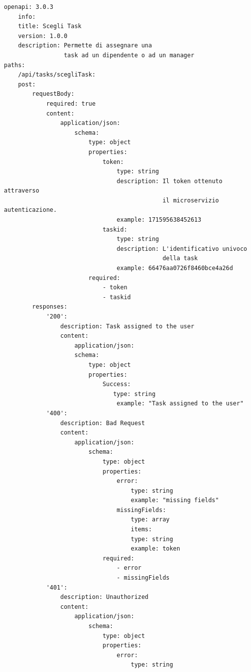 \documentclass{report}
\begin{document}
\begin{verbatim}
openapi: 3.0.3
    info:
    title: Scegli Task
    version: 1.0.0
    description: Permette di assegnare una
                 task ad un dipendente o ad un manager
paths:
    /api/tasks/scegliTask:
    post:
        requestBody:
            required: true
            content:
                application/json:
                    schema:
                        type: object
                        properties:
                            token:
                                type: string
                                description: Il token ottenuto attraverso
                                             il microservizio autenticazione.
                                example: 171595638452613
                            taskid:
                                type: string
                                description: L'identificativo univoco
                                             della task
                                example: 66476aa0726f8460bce4a26d
                        required:
                            - token
                            - taskid
        responses:
            '200':
                description: Task assigned to the user
                content:
                    application/json:
                    schema:
                        type: object
                        properties:
                            Success:
                               type: string
                                example: "Task assigned to the user"
            '400':
                description: Bad Request
                content:
                    application/json:
                        schema:
                            type: object
                            properties:
                                error:
                                    type: string
                                    example: "missing fields"
                                missingFields:
                                    type: array
                                    items:
                                    type: string
                                    example: token
                            required:
                                - error
                                - missingFields
            '401':
                description: Unauthorized
                content:
                    application/json:
                        schema:
                            type: object
                            properties:
                                error:
                                    type: string

\end{verbatim}
\end{document}
